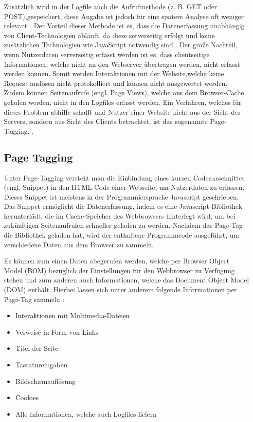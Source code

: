 Zusätzlich wird in der Logfile auch die Aufrufmethode (z. B. GET oder POST),gespeichert, diese Angabe ist jedoch für eine spätere Analyse oft weniger relevant \parencite[Kap.2.2]{Hassler2019}. Der Vorteil dieser Methode ist es, dass die Datenerfassung unabhängig von Client-Technologien abläuft, da diese serverseitig erfolgt und keine zusätzlichen Technologien wie JavaScript notwendig sind \parencite{RyteLogFiles}. Der große Nachteil, wenn Nutzerdaten serverseitig erfasst werden ist es, dass clientseitige Informationen, welche nicht an den Webserver übertragen werden, nicht erfasst werden können. Somit werden Interaktionen mit der Website,welche keine Request auslösen nicht protokolliert und können nicht ausgewertet werden. Zudem können Seitenaufrufe (engl. Page Views), welche aus dem Browser-Cache geladen werden, nicht in den Logfiles erfasst werden. Ein Verfahren, welches für dieses Problem abhilfe schafft und Nutzer einer Website nicht aus der Sicht des Servers, sondern aus Sicht des Clients betrachtet, ist das sogenannte Page-Tagging. \parencite{CounterCodePageTagging}, \parencite{CounterCodeLogFiles}

\subsection{Page Tagging}
\label{sec:pagetagging}
Unter Page-Tagging versteht man die Einbindung eines kurzen Codeausschnittes (engl. Snippet) in den HTML-Code einer Webseite, um Nutzerdaten zu erfassen. Dieses Snippet ist meistens in der Programmiersprache Javascript geschrieben. Das Snippet ermöglicht die Datenerfassung, indem es eine Javascript-Bibliothek herunterlädt, die im Cache-Speicher des Webbrowsers hinterlegt wird, um bei zukünftigen Seitenaufrufen schneller geladen zu werden. Nachdem das Page-Tag die Bibliothek geladen hat, wird der enthaltene Programmcode ausgeführt, um verschiedene Daten aus dem Browser zu sammeln. \parencite[S.70-71]{Dykes2014}

Es können zum einen Daten abegerufen werden, welche per Browser Object Model (BOM) bezüglich der Einstellungen für den Webbrowser zu Verfügung stehen und zum anderen auch Informationen, welche das Document Object Model (DOM) enthält. Hierbei lassen sich unter anderem folgende Informationen per Page-Tag sammeln \parencite[Kap.2.3]{Hassler2019}:

\begin{itemize}
    \item Interaktionen mit Multimedia-Dateien
    \item Verweise in Form von Links
    \item Titel der Seite
    \item Tastatureingaben
    \item Bildschirmauflösung
    \item Cookies
    \item Alle Informationen, welche auch Logfiles liefern
\end{itemize}


